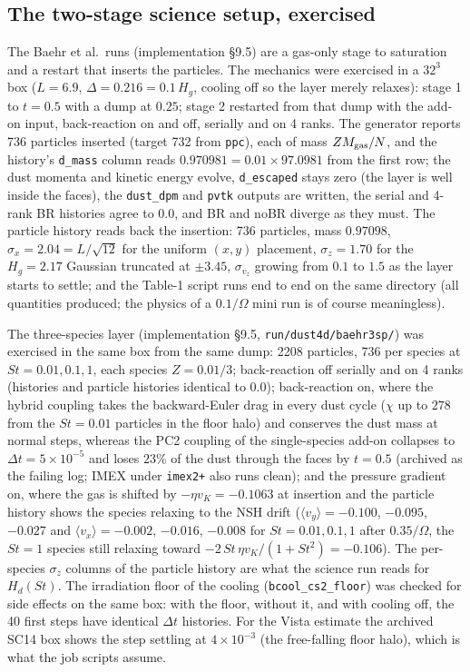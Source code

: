 \documentclass[11pt]{article}
\newcommand{\code}[1]{\texttt{#1}}
\newcommand{\file}[1]{\texttt{#1}}
\begin{document}
\subsection{The two-stage science setup, exercised}

The Baehr et al.\ runs (implementation \S9.5) are a gas-only stage to saturation and
a restart that inserts the particles. The mechanics were exercised in a $32^3$ box
($L = 6.9$, $\Delta = 0.216 = 0.1\,H_g$, cooling off so the layer merely relaxes):
stage 1 to $t = 0.5$ with a dump at $0.25$; stage 2 restarted from that dump with the
add-on input, back-reaction on and off, serially and on 4 ranks. The generator reports
736 particles inserted (target 732 from \code{ppc}), each of mass $Z M_{\rm gas}/N$, and
the history's \code{d\_mass} column reads $0.970981 = 0.01\times97.0981$ from the first
row; the dust momenta and kinetic energy evolve, \code{d\_escaped} stays zero (the layer
is well inside the faces), the \code{dust\_dpm} and \code{pvtk} outputs are written, the
serial and 4-rank BR histories agree to $0.0$, and BR and noBR diverge as they must.
The particle history reads back the insertion: 736 particles, mass $0.97098$,
$\sigma_x = 2.04 = L/\sqrt{12}$ for the uniform $(x,y)$ placement, $\sigma_z = 1.70$
for the $H_g = 2.17$ Gaussian truncated at $\pm3.45$, $\sigma_{v_z}$ growing from $0.1$ to
$1.5$ as the layer starts to settle; and the Table-1 script runs end to end on the same
directory (all quantities produced; the physics of a $0.1/\Omega$ mini run is of course
meaningless).

The three-species layer (implementation \S9.5, \file{run/dust4d/baehr3sp/}) was
exercised in the same box from the same dump: 2208 particles, 736 per species at
$St = 0.01, 0.1, 1$, each species $Z = 0.01/3$; back-reaction off serially and on 4
ranks (histories and particle histories identical to $0.0$); back-reaction on, where
the hybrid coupling takes the backward-Euler drag in every dust cycle ($\chi$ up to
$278$ from the $St = 0.01$ particles in the floor halo) and conserves the dust mass at
normal steps, whereas the PC2 coupling of the single-species add-on collapses to
$\Delta t = 5\times10^{-5}$ and loses $23\%$ of the dust through the faces by $t =
0.5$ (archived as the failing log; IMEX under \code{imex2+} also runs clean); and the
pressure gradient on, where the gas is shifted by $-\eta v_K = -0.1063$ at insertion
and the particle history shows the species relaxing to the NSH drift ($\langle v_y
\rangle = -0.100$, $-0.095$, $-0.027$ and $\langle v_x\rangle = -0.002$, $-0.016$,
$-0.008$ for $St = 0.01, 0.1, 1$ after $0.35/\Omega$, the $St = 1$ species still
relaxing toward $-2\,St\,\eta v_K/(1+St^2) = -0.106$). The per-species $\sigma_z$
columns of the particle history are what the science run reads for $H_d(St)$.
The irradiation floor of the cooling (\code{bcool\_cs2\_floor}) was checked for
side effects on the same box: with the floor, without it, and with cooling off, the 40
first steps have identical $\Delta t$ histories. For the Vista estimate the archived
SC14 box shows the step settling at $4\times10^{-3}$ (the free-falling floor halo),
which is what the job scripts assume.
\end{document}
